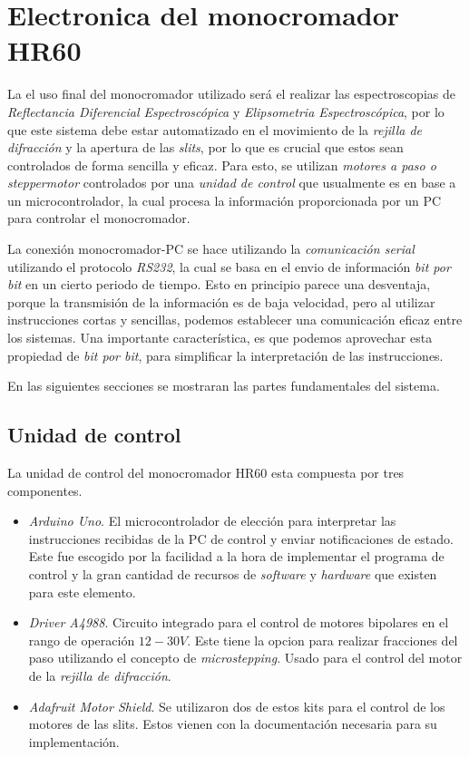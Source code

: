 \section{Electronica del monocromador HR60}
\label{sec:ch2-electronic}
La el uso final del monocromador utilizado será el realizar las espectroscopias de \textit{Reflectancia Diferencial Espectroscópica} y \textit{Elipsometria Espectroscópica}, por lo que este sistema debe estar automatizado en el movimiento de la \textit{rejilla de difracción} y la apertura de las \textit{slits}, por lo que es crucial que estos sean controlados de forma sencilla y eficaz. Para esto, se utilizan \textit{motores a paso o steppermotor} controlados por una \textit{unidad de control} que usualmente es en base a un microcontrolador, la cual procesa la información proporcionada por un PC para controlar el monocromador. 

La conexión monocromador-PC se hace utilizando la \textit{comunicación serial} utilizando el protocolo \textit{RS232}, la cual se basa en el envio de información \textit{bit por bit} en un cierto periodo de tiempo. Esto en principio parece una desventaja, porque la transmisión de la información es de baja velocidad, pero al utilizar instrucciones cortas y sencillas, podemos establecer una comunicación eficaz entre los sistemas. Una importante característica, es que podemos aprovechar esta propiedad de \textit{bit por bit}, para simplificar la interpretación de las instrucciones.

En las siguientes secciones se mostraran las partes fundamentales del sistema.

\subsection{Unidad de control}
\label{sec:ch2-control-unit}
La unidad de control del monocromador HR60 esta compuesta por tres componentes.
\begin{itemize}
    \item \textit{Arduino Uno}. El microcontrolador de elección para interpretar las instrucciones recibidas de la PC de control y enviar notificaciones de estado. Este fue escogido por la facilidad a la hora de implementar el programa de control y la gran cantidad de recursos de \textit{software} y \textit{hardware} que existen para este elemento.
    \item \textit{Driver A4988}. Circuito integrado para el control de motores bipolares en el rango de operación $12-30 V$. Este tiene la opcion para realizar fracciones del paso utilizando el concepto de \textit{microstepping}. Usado para el control del motor de la \textit{rejilla de difracción}.
    \item \textit{Adafruit Motor Shield}. Se utilizaron dos de estos kits para el control de los motores de las slits. Estos vienen con la documentación necesaria para su implementación.
\end{itemize}

